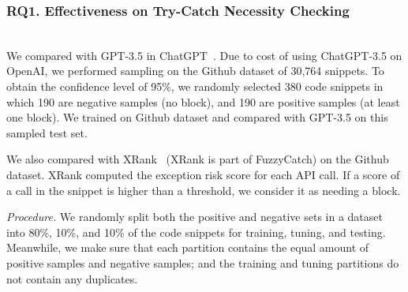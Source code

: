 \subsubsection{RQ1. Effectiveness on Try-Catch Necessity Checking}~\\
 We compared {\xblock} with
GPT-3.5 in ChatGPT~\cite{ChatGPT}. Due to cost of using ChatGPT-3.5 on
OpenAI, we performed sampling on the Github dataset of 30,764
snippets. To obtain the confidence level of 95\%, we randomly selected
380 code snippets in which 190 are negative samples
(no  block), and 190 are positive samples (at least
one  block). We trained on Github dataset and
compared with GPT-3.5 on this sampled test set.

We also compared {\xblock} with XRank~\cite{xrank-fse20} (XRank is
part of FuzzyCatch) on the Github dataset. XRank computed
the exception risk score for each API call. If a score of a call in
the snippet is higher than a threshold, we consider it as needing a
 block.

{\em Procedure.} We randomly split both the positive and negative sets
in a dataset into 80\%, 10\%, and 10\% of the code
snippets for training, tuning, and testing. Meanwhile, we make sure
that each partition contains the equal amount of positive samples and
negative samples; and the training and tuning partitions do not
contain any duplicates. 

